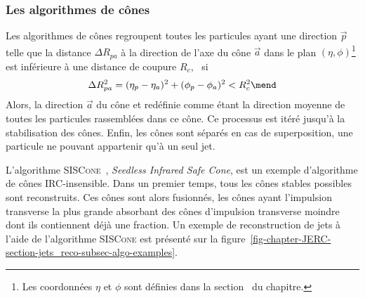 \subsubsection{Les algorithmes de cônes}
Les algorithmes de cônes regroupent toutes les particules ayant une direction $\vec{p}$ telle que la distance $\Delta R_{pa}$ à la direction de l'axe du cône $\vec{a}$ dans le plan $(\eta,\phi)$\footnote{Les coordonnées $\eta$ et $\phi$ sont définies dans la section~ du chapitre.} est inférieure à une distance de coupure $R_c$, \ie\ si
\begin{equation}
\Delta R_{pa} ^2 = (\eta_p - \eta_a)^2 + (\phi_p - \phi_a)^2 < R_c^2
\mend
\end{equation}
Alors, la direction $\vec{a}$ du cône et redéfinie comme étant la direction moyenne de toutes les particules rassemblées dans ce cône. Ce processus est itéré jusqu'à la stabilisation des cônes.
Enfin, les cônes sont séparés en cas de superposition, une particule ne pouvant appartenir qu'à un seul jet.
\par L'algorithme \textsc{SISCone}~\cite{SISCone}, \emph{Seedless Infrared Safe Cone}, est un exemple d'algorithme de cônes IRC-insensible.
Dans un premier temps, tous les cônes stables possibles sont reconstruits.
Ces cônes sont alors fusionnés, les cônes ayant l'impulsion transverse la plus grande absorbant des cônes d'impulsion transverse moindre dont ils contiennent déjà une fraction.
Un exemple de reconstruction de jets à l'aide de l'algorithme \textsc{SISCone} est présenté sur la figure~\ref{fig-chapter-JERC-section-jets_reco-subsec-algo-examples}.
